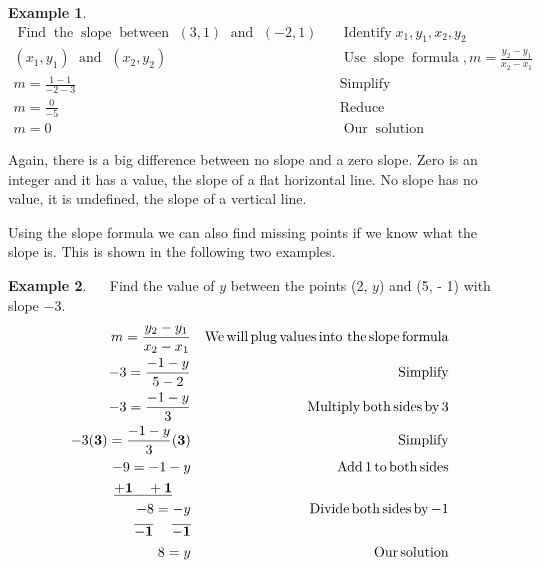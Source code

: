 \documentclass[12pt]{book}
\theoremstyle{definition}
\newtheorem{example}{Example}
\newcommand{\tmop}[1]{\ensuremath{\operatorname{#1}}}
\begin{document}
\begin{example}\label{Lin52}
  \begin{eqnarray*}
    \tmop{Find} \tmop{the} \tmop{slope} \tmop{between~} (3, 1) \tmop{~and~} (- 2,
    1) &  & \tmop{Identify} x_1, y_1, x_2, y_2\\
    (x_1, y_1) \tmop{~and~} (x_2, y_2) &  & \tmop{Use} \tmop{slope}
    \tmop{formula}, m = \frac{y_2 - y_1}{x_2 - x_1}\\
    m = \frac{1 - 1}{- 2 - 3} &  & \tmop{Simplify}\\
    m = \frac{0}{- 5} &  & \tmop{Reduce}\\
    m = 0 &  & \tmop{Our} \tmop{solution}
  \end{eqnarray*}
\end{example}
Again, there is a big difference between no slope and a zero slope. Zero is an integer and it has a value, the slope of a flat horizontal line. No slope has no value, it is undefined, the slope of a vertical line.\par
Using the slope formula we can also find missing points if we know what the slope is. This is shown in the following two examples.
\begin{example}\label{Lin53}~~
 Find the value of $y$ between the points (2, $y$) and (5, - 1) with slope $- 3$.\\
  \begin{eqnarray*}
    m = \frac{y_2 - y_1}{x_2 - x_1} &  & \tmop{We} \tmop{will} \tmop{plug}
    \tmop{values} \tmop{into~the} \tmop{slope} \tmop{formula}\\
    - 3 = \frac{- 1 - y}{5 - 2} &  & \tmop{Simplify}\\
    - 3 = \frac{- 1 - y}{3} &  & \tmop{Multiply} \tmop{both} \tmop{sides}
    \tmop{by} 3\\
    - 3 {\bf(3)} = \frac{- 1 - y}{3} {\bf(3)} &  & \tmop{Simplify}\\
    - 9 = - 1 - y &  & \tmop{Add} 1 \tmop{to} \tmop{both} \tmop{sides}\\
    \bf{\underline{+ 1 ~~~+ 1}}~~~~  &  & \\
    - 8 = - y &  & \tmop{Divide} \tmop{both} \tmop{sides} \tmop{by} - 1\\
    \bf{\overline{- 1} ~~~~ \overline{- 1}} &  & \\
    8 = y &  & \tmop{Our} \tmop{solution}
  \end{eqnarray*}
\end{example}
\end{document}
